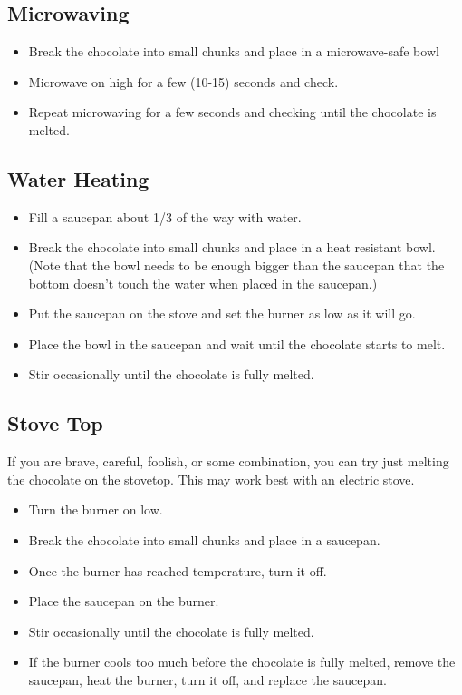 \documentclass[10pt, openany]{book}
\begin{document}
\subsection{Microwaving}
\begin{itemize}
  \item Break the chocolate into small chunks and place in a microwave-safe bowl
  \item Microwave on high for a few (10-15) seconds and check.
  \item Repeat microwaving for a few seconds and checking until the chocolate is melted.
\end{itemize}
\subsection{Water Heating}
\begin{itemize}
  \item Fill a saucepan about 1/3 of the way with water.
  \item Break the chocolate into small chunks and place in a heat resistant bowl.  (Note that the bowl needs to be enough bigger than the saucepan that the bottom doesn't touch the water when placed in the saucepan.)
  \item Put the saucepan on the stove and set the burner as low as it will go.
  \item Place the bowl in the saucepan and wait until the chocolate starts to melt.
  \item Stir occasionally until the chocolate is fully melted.
\end{itemize}
\subsection{Stove Top}
If you are brave, careful, foolish, or some combination, you can try just melting the chocolate on the stovetop.  This may work best with an electric stove.
\begin{itemize}
  \item Turn the burner on low.
  \item Break the chocolate into small chunks and place in a saucepan.
  \item Once the burner has reached temperature, turn it off.
  \item Place the saucepan on the burner.
  \item Stir occasionally until the chocolate is fully melted.
  \item If the burner cools too much before the chocolate is fully melted, remove the saucepan, heat the burner, turn it off, and replace the saucepan.
\end{itemize}
\end{document}
